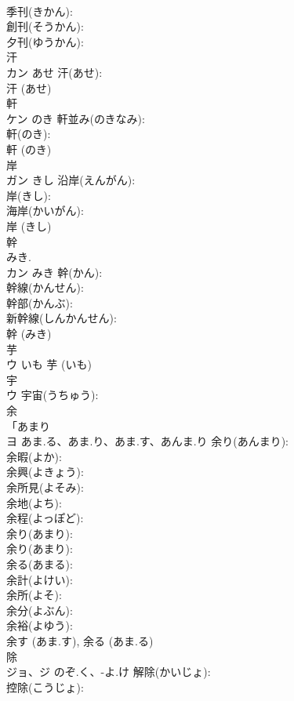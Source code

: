 \documentclass[8pt]{extreport}
\begin{document}
\begin{CJK}{UTF8}{min}
\\	季刊(きかん): 
\\	創刊(そうかん): 
\\	夕刊(ゆうかん): 
\\	汗			
\\	カン	あせ	汗(あせ): 
\\	汗 (あせ)
\\	軒			
\\	ケン	のき	軒並み(のきなみ): 
\\	軒(のき): 
\\	軒 (のき)
\\	岸			
\\	ガン	きし	沿岸(えんがん): 
\\	岸(きし): 
\\	海岸(かいがん): 
\\	岸 (きし)
\\	幹			
\\	みき.	
\\	カン	みき	幹(かん): 
\\	幹線(かんせん): 
\\	幹部(かんぶ): 
\\	新幹線(しんかんせん): 
\\	幹 (みき)
\\	芋			
\\	ウ	いも		芋 (いも)
\\	宇			
\\	ウ		宇宙(うちゅう): 
\\	余			
\\	「あまり 
\\	ヨ	あま.る、あま.り、あま.す、あんま.り	余り(あんまり): 
\\	余暇(よか): 
\\	余興(よきょう): 
\\	余所見(よそみ): 
\\	余地(よち): 
\\	余程(よっぽど): 
\\	余り(あまり): 
\\	余り(あまり): 
\\	余る(あまる): 
\\	余計(よけい): 
\\	余所(よそ): 
\\	余分(よぶん): 
\\	余裕(よゆう): 
\\	余す (あま.す), 余る (あま.る)
\\	除			
\\	ジョ、ジ	のぞ.く、-よ.け	解除(かいじょ): 
\\	控除(こうじょ): 

\end{CJK}
\end{document}
